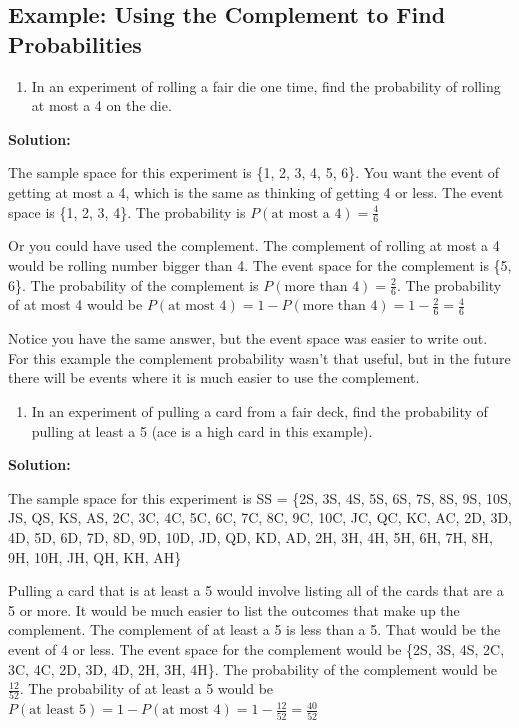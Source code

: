 \documentclass[
]{book}
\providecommand{\tightlist}{%
  \setlength{\itemsep}{0pt}\setlength{\parskip}{0pt}}
\begin{document}
\hypertarget{example-using-the-complement-to-find-probabilities}{%
\subsection{Example: Using the Complement to Find Probabilities}\label{example-using-the-complement-to-find-probabilities}}

\begin{enumerate}
\def\labelenumi{\alph{enumi}.}
\tightlist
\item
  In an experiment of rolling a fair die one time, find the probability of rolling at most a 4 on the die.
\end{enumerate}

\textbf{Solution:}

The sample space for this experiment is \{1, 2, 3, 4, 5, 6\}. You want the event of getting at most a 4, which is the same as thinking of getting 4 or less. The event space is \{1, 2, 3, 4\}. The probability is \(P(\text{at most a 4})=\frac{4}{6}\)

Or you could have used the complement. The complement of rolling at most a 4 would be rolling number bigger than 4. The event space for the complement is \{5, 6\}. The probability of the complement is \(P(\text{more than 4})=\frac{2}{6}\). The probability of at most 4 would be \(P(\text{at most 4})=1-P(\text{more than 4})=1-\frac{2}{6}=\frac{4}{6}\)

Notice you have the same answer, but the event space was easier to write out. For this example the complement probability wasn't that useful, but in the future there will be events where it is much easier to use the
complement.

\begin{enumerate}
\def\labelenumi{\alph{enumi}.}
\setcounter{enumi}{1}
\tightlist
\item
  In an experiment of pulling a card from a fair deck, find the probability of pulling at least a 5 (ace is a high card in this example).
\end{enumerate}

\textbf{Solution:}

The sample space for this experiment is SS = \{2S, 3S, 4S, 5S, 6S, 7S, 8S, 9S, 10S, JS, QS, KS, AS, 2C, 3C, 4C, 5C, 6C, 7C, 8C, 9C, 10C, JC, QC, KC, AC, 2D, 3D, 4D, 5D, 6D, 7D, 8D, 9D, 10D, JD, QD, KD, AD, 2H, 3H, 4H, 5H, 6H, 7H, 8H, 9H, 10H, JH, QH, KH, AH\}

Pulling a card that is at least a 5 would involve listing all of the cards that are a 5 or more. It would be much easier to list the outcomes that make up the complement. The complement of at least a 5 is less than a 5. That would be the event of 4 or less. The event space for the complement would be \{2S, 3S, 4S, 2C, 3C, 4C, 2D, 3D, 4D, 2H, 3H, 4H\}. The probability of the complement would be \(\frac{12}{52}\). The probability of at least a 5 would be \(P(\text{at least 5})=1-P(\text{at most 4})=1-\frac{12}{52}=\frac{40}{52}\)
\end{document}
